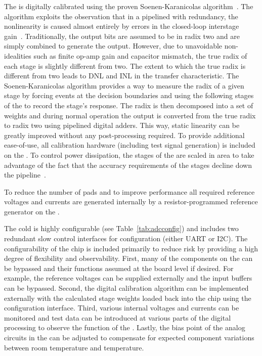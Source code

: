The  is digitally calibrated using the proven Soenen-Karanicolas algorithm~\cite{280084,372864}. The algorithm exploits the observation that in a pipelined  with redundancy, the  nonlinearity is caused almost entirely by errors in the closed-loop interstage gain~\cite{121557}. Traditionally, the  output bits are assumed to be in radix two and are simply combined to generate the  output. However, due to unavoidable non-idealities such as finite op-amp gain and capacitor mismatch, the true radix of each stage is slightly different from two. The extent to which the true radix is different from two leads to DNL and INL in the  transfer characteristic. The Soenen-Karanicolas algorithm provides a way to measure the radix of a given stage by forcing events at the decision boundaries and using the following stages of the  to record the stage's response. The radix is then decomposed into a set of weights and during normal operation the  output is converted from the true radix to radix two using pipelined digital adders. This way, static linearity can be greatly improved without any post-processing required. To provide additional ease-of-use, all calibration hardware (including test signal generation) is included on the  . To control power dissipation, the stages of the  are scaled in area to take advantage of the fact that the accuracy requirements of the stages decline down the pipeline~\cite{494191}.

To reduce the number of pads and to improve performance all required reference voltages and currents are generated internally by a resistor-programmed reference generator on the .

The cold  is highly configurable (see Table~\ref{tab:adcconfig}) and includes two redundant slow control interfaces for configuration (either UART or I2C). The configurability of the chip is included primarily to reduce risk by providing a high degree of flexibility and observability. First, many of the components on the  can be bypassed and their functions assumed at the board level if desired. For example, the  reference voltages can be supplied externally and the input buffers can be bypassed. Second, the  digital calibration algorithm can be implemented externally with the calculated stage weights loaded back into the chip using the configuration interface. Third, various internal voltages and currents can be monitored and test data can be introduced at various parts of the digital processing to observe the function of the . Lastly, the bias point of the analog circuits in the  can be adjusted to compensate for expected component variations between room temperature and \lar temperature.

